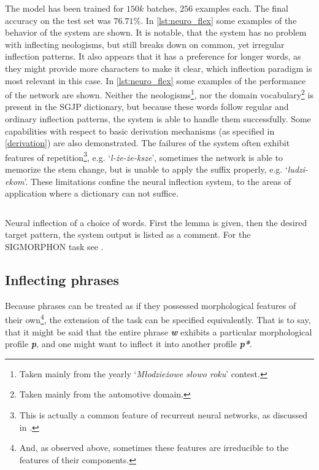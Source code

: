 \documentclass[12pt]{article}
\newcommand{\inlinegloss}[1]{`\textit{#1}'}
\newcommand{\symbolic}[1]{\textit{\textbf{#1}}}
\begin{document}
The model has been trained for $150k$ batches, $256$ examples each. The final accuracy on the test set was $76.71\%$. In \autoref{lst:neuro_flex} some examples of the behavior of the system are shown. It is notable, that the system has no problem with inflecting neologisms, but still breaks down on common, yet irregular inflection patterns. It also appears that it has a preference for longer words, as they might provide more characters to make it clear, which inflection paradigm is most relevant in this case. In \autoref{lst:neuro_flex} some examples of the performance of the network are shown. Neither the neologisms\footnote{Taken mainly from the yearly \inlinegloss{Młodzieżowe słowo roku} contest.}, nor the domain vocabulary\footnote{Taken mainly from the automotive domain.} is present in the SGJP dictionary, but because these words follow regular and ordinary inflection patterns, the system is able to handle them successfully. Some capabilities with respect to basic derivation mechanisms (as specified in \autoref{derivation}) are also demonstrated. The failures of the system often exhibit features of repetition\footnote{This is actually a common feature of recurrent neural networks, as discussed in \cite{shcherbakov-etal-2020-exploring}.}, e.g. \inlinegloss{l-że-że-ksze}, sometimes the network is able to memorize the stem change, but is unable to apply the suffix properly, e.g. \inlinegloss{ludzi-ekom}. These limitations confine the neural inflection system, to the areas of application where a dictionary can not suffice.

\begin{listing}[htbp]
\inputminted[linenos,tabsize=2,breaklines]{Python}{neuro_examples_snippet.py}
\caption{Neural inflection of a choice of words. First the lemma is given, then the desired target pattern, the system output is listed as a comment. For the SIGMORPHON task see \cite{pimentel-ryskina-etal-2021-sigmorphon}.}
\vspace{-10pt}
\label{lst:neuro_flex}
\end{listing}

\subsection{Inflecting phrases}

Because phrases can be treated as if they possessed morphological features of their own\footnote{And, as observed above, sometimes these features are irreducible to the features of their components.}, the extension of the task can be specified equivalently. That is to say, that it might be said that the entire phrase \symbolic{w} exhibits a particular morphological profile \symbolic{p}, and one might want to inflect it into another profile \symbolic{p*}. 
\end{document}
